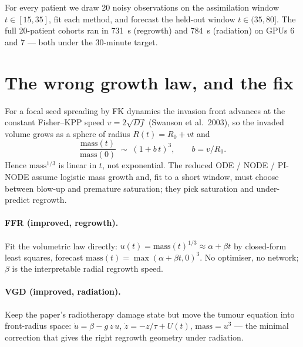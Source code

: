 \documentclass[11pt]{article}
\begin{document}
For every patient we draw 20 noisy observations on the assimilation window
$t\in[15,35]$, fit each method, and forecast the held-out window $t\in(35,80]$.
The full 20-patient cohorts ran in \SI{731}{s} (regrowth) and \SI{784}{s}
(radiation) on GPUs 6 and 7 --- both under the 30-minute target.

\section{The wrong growth law, and the fix}
For a focal seed spreading by FK dynamics the invasion front advances at the
constant Fisher--KPP speed $v=2\sqrt{D f}$ (Swanson et al.\ 2003), so the invaded
volume grows as a sphere of radius $R(t)=R_0+vt$ and
\begin{equation}
\frac{\mathrm{mass}(t)}{\mathrm{mass}(0)}\;\sim\;(1+b\,t)^3,
\qquad b=v/R_0 .
\label{eq:vol}
\end{equation}
Hence $\mathrm{mass}^{1/3}$ is linear in $t$, not exponential. The reduced ODE /
NODE / PI-NODE assume logistic mass growth and, fit to a short window, must
choose between blow-up and premature saturation; they pick saturation and
under-predict regrowth.

\paragraph{FFR (improved, regrowth).} Fit the volumetric law directly:
$u(t)=\mathrm{mass}(t)^{1/3}\approx\alpha+\beta t$ by closed-form least squares,
forecast $\mathrm{mass}(t)=\max(\alpha+\beta t,0)^3$. No optimiser, no network;
$\beta$ is the interpretable radial regrowth speed.

\paragraph{VGD (improved, radiation).} Keep the paper's radiotherapy damage
state but move the tumour equation into front-radius space:
$\dot u=\beta-g\,z\,u$, $\dot z=-z/\tau+U(t)$, $\mathrm{mass}=u^3$ --- the minimal
correction that gives the right regrowth geometry under radiation.
\end{document}
